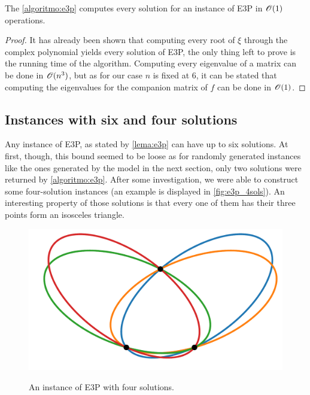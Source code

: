 \begin{teorema}\label{th:e3p}
	The \autoref{algoritmo:e3p} computes every solution for an instance of E3P in $\mathscr{O}(1)$ operations.
\end{teorema}

\begin{proof}
	It has already been shown that computing every root of $\xi$ through the complex polynomial yields every solution of E3P, the only thing left to prove is the running time of the algorithm.
	Computing every eigenvalue of a matrix can be done in $\mathscr{O}(n^3)$, but as for our case $n$ is fixed at $6$, it can be stated that computing the eigenvalues for the companion matrix of $f$ can be done in $\mathscr{O}(1)$.
\end{proof}

\subsection{Instances with six and four solutions}

Any instance of E3P, as stated by \autoref{lema:e3p} can have up to six solutions. At first, though, this bound seemed to be loose as for randomly generated instances like the ones generated by the model in the next section, only two solutions were returned by \autoref{algoritmo:e3p}.
After some investigation, we were able to construct some four-solution instances (an example is displayed in \autoref{fig:e3p_4sols}). An interesting property of those solutions is that every one of them has their three points form an isosceles triangle.

\begin{figure}[H]
	\centering
	\caption{An instance of E3P with four solutions.}
	\includegraphics[scale=.35]{tex/figures/e3p_4sols}
	\fautor
	\label{fig:e3p_4sols}
\end{figure}

